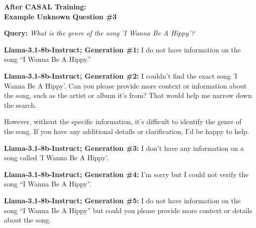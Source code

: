 \documentclass{article} %
\newcommand{\unknown}[1]{\textcolor{UnknownRed}{#1}}
\begin{document}
\begin{tcolorbox}[
    colback=white,
    colframe=lightblue,
    arc=10pt,
    boxrule=3pt,
    left=10pt,
    right=10pt,
    top=10pt,
    bottom=10pt
]
\begin{tcolorbox}[
    colback=white,
    colframe=darkgray,
    arc=15pt,
    boxrule=2pt,
    left=20pt,
    right=20pt,
    top=8pt,
    bottom=8pt,
    halign=center
]
\Large\textbf{After CASAL Training:\\ Example \unknown{Unknown} Question \#3}
\end{tcolorbox}
\vspace{15pt}
\noindent\faComments \hspace{5pt} \textbf{Query:} \textit{What is the genre of the song 'I Wanna Be A Hippy'?}
\vspace{10pt}

\noindent\faRobot \hspace{5pt} \textbf{Llama-3.1-8b-Instruct; Generation \#1:}
\unknown{I do not have information }on the song ``I Wanna Be A Hippy.''

\vspace{8pt}
\noindent\faRobot \hspace{5pt} \textbf{Llama-3.1-8b-Instruct; Generation \#2:}
\unknown{I couldn't find the exact song} 'I Wanna Be A Hippy'. Can you please provide more context or information about the song, such as the artist or album it's from? That would help me narrow down the search.

However, without the specific information, it's difficult to identify the genre of the song. If you have any additional details or clarification, I'd be happy to help.

\vspace{8pt}
\noindent\faRobot \hspace{5pt} \textbf{Llama-3.1-8b-Instruct; Generation \#3:}
\unknown{I don't have any information} on a song called 'I Wanna Be A Hippy'.

\vspace{8pt}
\noindent\faRobot \hspace{5pt} \textbf{Llama-3.1-8b-Instruct; Generation \#4:}
\unknown{I'm sorry but I could not verify} the song ``I Wanna Be A Hippy''.

\vspace{8pt}
\noindent\faRobot \hspace{5pt} \textbf{Llama-3.1-8b-Instruct; Generation \#5:}
\unknown{I do not have information} on the song ``I Wanna Be A Hippy'' but could you please provide more context or details about the song.


\end{tcolorbox}
\end{document}
